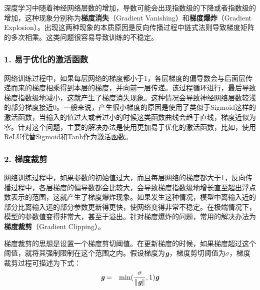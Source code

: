 \parinterval  深度学习中随着神经网络层数的增加，导数可能会出现指数级的下降或者指数级的增加，这种现象分别称为{\small\sffamily\bfseries{梯度消失}}（Gradient Vanishing）和{\small\sffamily\bfseries{梯度爆炸}}（Gradient Explosion）。出现这两种现象的本质原因是反向传播过程中链式法则导致梯度矩阵的多次相乘。这类问题很容易导致训练的不稳定。


\subsubsection{1. 易于优化的激活函数}

\parinterval  网络训练过程中，如果每层网络的梯度都小于1，各层梯度的偏导数会与后面层传递而来的梯度相乘得到本层的梯度，并向前一层传递。该过程循环进行，最后导致梯度指数级地减小，这就产生了梯度消失现象。这种情况会导致神经网络层数较浅的部分梯度接近0。一般来说，产生很小梯度的原因是使用了类似于Sigmoid这样的激活函数，当输入的值过大或者过小的时候这类函数曲线会趋于直线，梯度近似为零。针对这个问题，主要的解决办法是使用更加易于优化的激活函数，比如，使用ReLU代替Sigmoid和Tanh作为激活函数。


\subsubsection{2. 梯度裁剪}

\parinterval  网络训练过程中，如果参数的初始值过大，而且每层网络的梯度都大于1，反向传播过程中，各层梯度的偏导数都会比较大，会导致梯度指数级地增长直至超出浮点数表示的范围，这就产生了梯度爆炸现象。如果发生这种情况，模型中离输入近的部分比离输入远的部分参数更新得更快，使网络变得非常不稳定。在极端情况下，模型的参数值变得非常大，甚至于溢出。针对梯度爆炸的问题，常用的解决办法为{\small\sffamily\bfseries{梯度裁剪}}（Gradient Clipping）。

\parinterval    梯度裁剪的思想是设置一个梯度剪切阈值。在更新梯度的时候，如果梯度超过这个阈值，就将其强制限制在这个范围之内。假设梯度为${\textbf{\em g}}$，梯度剪切阈值为$\sigma $，梯度裁剪过程可描述为下式：
\begin{eqnarray}
{\textbf{\em g}}&=&{\textrm{min}}(\frac{\sigma}{\Vert {\textbf{\em g}}\Vert},1){\textbf{\em g}}
\label{eq:9-43}
\end{eqnarray}

